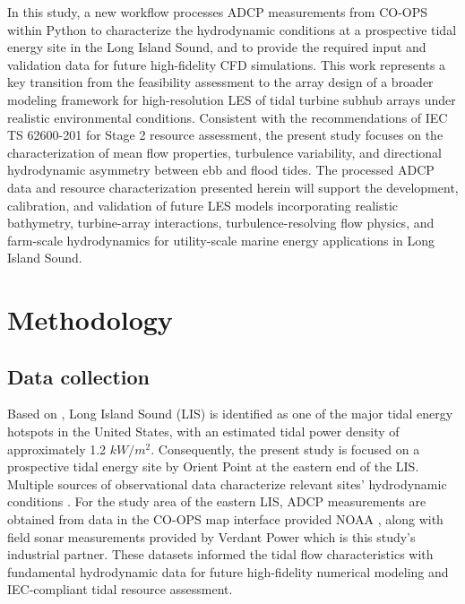 \documentclass[12pt,sort&compress]{elsarticle}
\theoremstyle{definition}%
\begin{document}
In this study, a new workflow processes ADCP measurements from CO-OPS within Python to characterize the hydrodynamic conditions at a prospective tidal energy site in the Long Island Sound, and to provide the required input and validation data for future high-fidelity CFD simulations. This work represents a key transition from the feasibility assessment to the array design of a broader modeling framework for high-resolution LES of tidal turbine subhub arrays under realistic environmental conditions. Consistent with the recommendations of IEC TS 62600-201 \cite{noauthor_iec_nodate} for Stage 2 resource assessment, the present study focuses on the characterization of mean flow properties, turbulence variability, and directional hydrodynamic asymmetry between ebb and flood tides. The processed ADCP data and resource characterization presented herein will support the development, calibration, and validation of future LES models incorporating realistic bathymetry, turbine-array interactions, turbulence-resolving flow physics, and farm-scale hydrodynamics for utility-scale marine energy applications in Long Island Sound.
\fi

\section{Methodology}
\label{sec:2}
\subsection{Data collection}
\label{subsec:2.1}
Based on \cite{kilcher_tidal_2023}, Long Island Sound (LIS) is identified as one of the major tidal energy hotspots in the United States, with an estimated tidal power density of approximately 1.2 $kW/m
^2$. Consequently, the present study is focused on a prospective tidal energy site by Orient Point at the eastern end of the LIS. Multiple sources of observational data characterize relevant sites' hydrodynamic conditions \cite{kilcher_tidal_2023, coops_map}. For the study area of the eastern LIS, ADCP measurements are obtained from data in the CO-OPS map interface provided NOAA \cite{coops_map}, along with field sonar measurements provided by Verdant Power which is this study's industrial partner. These datasets informed the tidal flow characteristics with fundamental hydrodynamic data for future high-fidelity numerical modeling and IEC-compliant tidal resource assessment.
\end{document}
